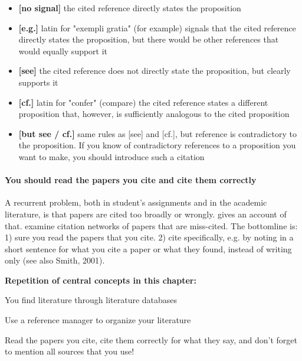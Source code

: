 \documentclass{tufte-book}
\begin{document}
\begin{itemize}
  \item \textbf{[no signal]} the cited reference directly states the proposition
  \item \textbf{[e.g.]} latin for "exempli gratia" (for example) signals that the cited reference directly states the proposition, but there would be other references that would equally support it
  \item \textbf{[see]} the cited reference does not directly state the proposition, but clearly supports it
  \item \textbf{[cf.]} latin for "confer" (compare) the cited reference states a different proposition that, however, is sufficiently analogous to the cited proposition
  \item \textbf{[but see / cf.]} same rules as [see] and [cf.], but reference is contradictory to the proposition. If you know of contradictory references to a proposition you want to make, you should introduce such a citation
\end{itemize}

\paragraph{You should read the papers you cite and cite them correctly} A recurrent problem, both in student's assignments and in the academic literature, is that papers are cited too broadly or wrongly. \citet{Editorial-Causecorrelationconjecture-2015} gives an account of that. \citet{Greenberg-Howcitationdistortions-2009} examine citation networks of papers that are miss-cited. The bottomline is: 1) sure you read the papers that you cite. 2) cite specifically, e.g. by noting in a short sentence for what you cite a paper or what they found, instead of writing only (see also Smith, 2001). 

\vspace{1cm}
\begin{mdframed}
    
\textbf{Repetition of central concepts in this chapter:} 

\begin{itemize*}
  \item You find literature through literature databases
  \item Use a reference manager to organize your literature
  \item Read the papers you cite, cite them correctly for what they say, and don't forget to mention all sources that you use!
\end{itemize*}

\end{mdframed}
\end{document}
